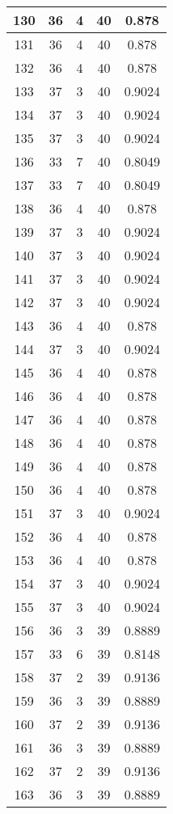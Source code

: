 \documentclass[letterpaper, 12pt]{article}
\begin{document}
\begin{longtable}{|c|c|c|c|c|}
\hline
130 & 36 & 4 & 40 & 0.878 \\
\hline
131 & 36 & 4 & 40 & 0.878 \\
\hline
132 & 36 & 4 & 40 & 0.878 \\
\hline
133 & 37 & 3 & 40 & 0.9024 \\
\hline
134 & 37 & 3 & 40 & 0.9024 \\
\hline
135 & 37 & 3 & 40 & 0.9024 \\
\hline
136 & 33 & 7 & 40 & 0.8049 \\
\hline
137 & 33 & 7 & 40 & 0.8049 \\
\hline
138 & 36 & 4 & 40 & 0.878 \\
\hline
139 & 37 & 3 & 40 & 0.9024 \\
\hline
140 & 37 & 3 & 40 & 0.9024 \\
\hline
141 & 37 & 3 & 40 & 0.9024 \\
\hline
142 & 37 & 3 & 40 & 0.9024 \\
\hline
143 & 36 & 4 & 40 & 0.878 \\
\hline
144 & 37 & 3 & 40 & 0.9024 \\
\hline
145 & 36 & 4 & 40 & 0.878 \\
\hline
146 & 36 & 4 & 40 & 0.878 \\
\hline
147 & 36 & 4 & 40 & 0.878 \\
\hline
148 & 36 & 4 & 40 & 0.878 \\
\hline
149 & 36 & 4 & 40 & 0.878 \\
\hline
150 & 36 & 4 & 40 & 0.878 \\
\hline
151 & 37 & 3 & 40 & 0.9024 \\
\hline
152 & 36 & 4 & 40 & 0.878 \\
\hline
153 & 36 & 4 & 40 & 0.878 \\
\hline
154 & 37 & 3 & 40 & 0.9024 \\
\hline
155 & 37 & 3 & 40 & 0.9024 \\
\hline
156 & 36 & 3 & 39 & 0.8889 \\
\hline
157 & 33 & 6 & 39 & 0.8148 \\
\hline
158 & 37 & 2 & 39 & 0.9136 \\
\hline
159 & 36 & 3 & 39 & 0.8889 \\
\hline
160 & 37 & 2 & 39 & 0.9136 \\
\hline
161 & 36 & 3 & 39 & 0.8889 \\
\hline
162 & 37 & 2 & 39 & 0.9136 \\
\hline
163 & 36 & 3 & 39 & 0.8889 \\

\end{longtable}
\end{document}
